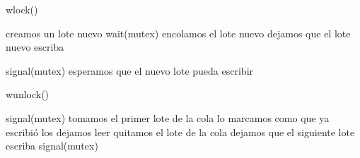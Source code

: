 \begin{algorithm}[H]
\caption{wlock()}
\begin{algorithmic}[1]
\STATE creamos un lote nuevo
\STATE wait(mutex)
\STATE encolamos el lote nuevo
\STATE dejamos que el lote nuevo escriba
\ENDIF

\STATE signal(mutex)
\STATE esperamos que el nuevo lote pueda escribir

\end{algorithmic}
\end{algorithm}

\begin{algorithm}[H]
\caption{wunlock()}
\begin{algorithmic}[1]
\STATE signal(mutex)
\STATE tomamos el primer lote de la cola
\STATE lo marcamos como que ya escribió
\STATE los dejamos leer
\ELSE
\STATE quitamos el lote de la cola
\STATE dejamos que el siguiente lote escriba
\ENDIF
\ENDIF
\STATE signal(mutex)
\end{algorithmic}
\end{algorithm}


